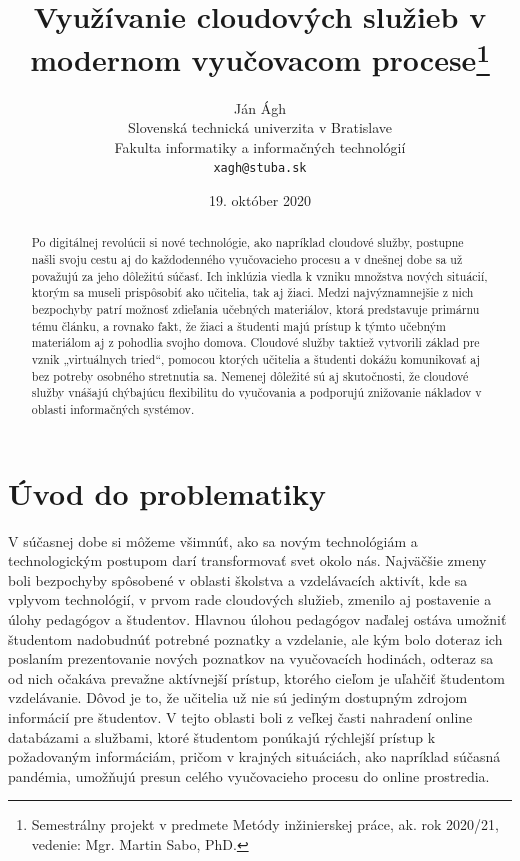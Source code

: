 \documentclass[10pt,slovak,a4paper]{article}%
\title{Využívanie cloudových služieb v 
modernom vyučovacom procese\thanks{Semestrálny projekt v predmete Metódy inžinierskej práce, ak. rok 2020/21, vedenie: Mgr. Martin Sabo, PhD.}}
\author{Ján Ágh\\[2pt]
	{\small Slovenská technická univerzita v Bratislave}\\
	{\small Fakulta informatiky a informačných technológií}\\
	{\small \texttt{xagh@stuba.sk}}
	}
\date{\small 19. október 2020}
\begin{document}
\maketitle

\begin{abstract}

Po digitálnej revolúcii si nové technológie, ako napríklad cloudové služby, postupne
našli svoju cestu aj do každodenného vyučovacieho procesu a v dnešnej dobe sa už považujú
za jeho dôležitú súčasť. Ich inklúzia viedla k vzniku množstva nových situácií, ktorým sa
museli prispôsobiť ako učitelia, tak aj žiaci. Medzi najvýznamnejšie z nich bezpochyby patrí
možnosť zdieľania učebných materiálov, ktorá predstavuje primárnu tému článku, a rovnako
fakt, že žiaci a študenti majú prístup k týmto učebným materiálom aj z pohodlia svojho
domova. Cloudové služby taktiež vytvorili základ pre vznik „virtuálnych tried“, pomocou
ktorých učitelia a študenti dokážu komunikovať aj bez potreby osobného stretnutia sa.
Nemenej dôležité sú aj skutočnosti, že cloudové služby vnášajú chýbajúcu flexibilitu do
vyučovania a podporujú znižovanie nákladov v oblasti informačných systémov.\cite{Babu_enrichingeducation}\cite{Koutsopoulos_schooloncloud}\cite{Narkar_cloud-basededucation}

\end{abstract}



\section{Úvod do problematiky}


V súčasnej dobe si môžeme všimnúť, ako sa novým technológiám a technologickým postupom darí transformovať svet okolo nás. Najväčšie zmeny boli bezpochyby spôsobené v oblasti školstva a vzdelávacích aktivít, kde sa vplyvom technológií, v prvom rade cloudových služieb, zmenilo aj postavenie a úlohy pedagógov a študentov.\cite{Koutsopoulos_schooloncloud} Hlavnou úlohou pedagógov naďalej ostáva umožniť študentom nadobudnúť potrebné poznatky a vzdelanie, ale kým bolo doteraz ich poslaním prezentovanie nových poznatkov na vyučovacích hodinách, odteraz sa od nich očakáva prevažne aktívnejší prístup, ktorého cieľom je uľahčiť študentom vzdelávanie.\cite{Koutsopoulos_schooloncloud} Dôvod je to, že učitelia už nie sú jediným dostupným zdrojom informácií pre študentov. V tejto oblasti boli z veľkej časti nahradení online databázami a službami, ktoré študentom ponúkajú rýchlejší prístup k požadovaným informáciám, pričom v krajných situáciách, ako napríklad súčasná pandémia, umožňujú presun celého vyučovacieho procesu do online prostredia.
\end{document}
